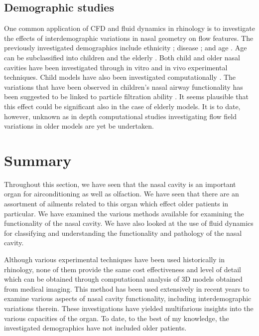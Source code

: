 \subsection{Demographic studies}
One common application of CFD and fluid dynamics in rhinology is to investigate the effects of interdemographic variations in nasal geometry on flow features. The previously investigated demographics include ethnicity \cite{Zhu2011}; disease \cite{Garcia2007}; and  age \cite{Xi2012}. Age can be subclassified into children \cite{Xi2012} and the elderly \cite{Lindemann2008}. Both child and older nasal cavities have been investigated through in vitro \cite{Weinhold2004} and in vivo \cite{Kalmovich2005, Edelstein1996, WhanKim2007, Lindemann2008} experimental techniques. Child models have also been investigated computationally \cite{Xi2012}. The variations that have been observed in children's nasal airway functionality has been suggested to be linked to particle filtration ability \cite{Xi2012}. It seems plausible that this effect could be significant also in the case of elderly models. It is to date, however, unknown as in depth computational studies investigating flow field variations in older models are yet be undertaken.


\section{Summary}

Throughout this section, we have seen that the nasal cavity is an important organ for airconditioning as well as olfaction. We have seen that there are an assortment of ailments related to this organ which effect older patients in particular. We have examined the various methods available for examining the functionality of the nasal cavity. We have also looked at the use of fluid dynamics for classifying and understanding the functionality and pathology of the nasal cavity.

Although various experimental techniques have been used historically in rhinology, none of them provide the same cost effectiveness and level of detail which can be obtained through computational analysis of 3D models obtained from medical imaging. This method has been used extensively in recent years to examine various aspects of nasal cavity functionality, including interdemographic variations therein. These investigations have yielded multifarious insights into the various capacities of the organ. To date, to the best of my knowledge, the investigated demographics have not included older patients.

